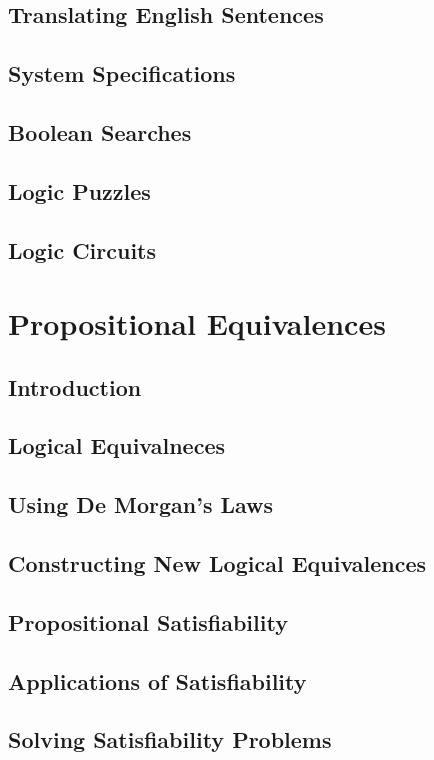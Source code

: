 \documentclass[11pt]{book}
\begin{document}
  \subsection{Translating English Sentences}
  \subsection{System Specifications}
  \subsection{Boolean Searches}
  \subsection{Logic Puzzles}
  \subsection{Logic Circuits}
  
 \section{Propositional Equivalences}
  \subsection{Introduction}
  \subsection{Logical Equivalneces}
  \subsection{Using De Morgan's Laws}
  \subsection{Constructing New Logical Equivalences}
  \subsection{Propositional Satisfiability}
  \subsection{Applications of Satisfiability}
  \subsection{Solving Satisfiability Problems}
  
\end{document}
